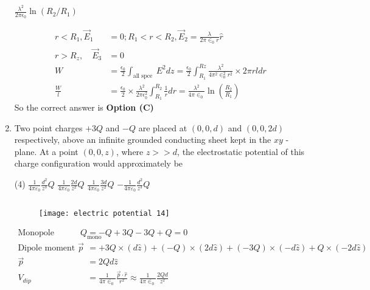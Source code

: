 \begin{enumerate}
\begin{tasks}
		\task[\textbf{D.}] $\frac{\lambda^{2}}{2 \pi \epsilon_{0}} \ln \left(R_{2} / R_{1}\right)$
	\end{tasks}
	\begin{answer}
		\begin{align*}
		r<R_{1}, \vec{E}_{1}&=0 ; R_{1}<r<R_{2}, \vec{E}_{2}=\frac{\lambda}{2 \pi \in_{0} r} \hat{r}\\
		r>R_{z}, \quad \vec{E}_{3}&=0\\
		W&=\frac{\epsilon_{0}}{2} \int_{\text {all spce }}{E^{2} d z}=\frac{\epsilon_{0}}{2} \int_{R_{1}}^{R z} \frac{\lambda^{2}}{4 \pi^{2} \in_{0}^{2} r^{2}} \times 2 \pi r l d r\\
		\frac{W}{l}&=\frac{\epsilon_{0}}{2} \times \frac{\lambda^{2}}{2 \pi \epsilon_{0}^{2}} \int_{R_{1}}^{R_{2}} \frac{1}{r} d r=\frac{\lambda^{2}}{4 \pi \in_{0}} \ln \left(\frac{R_{2}}{R_{1}}\right)
		\end{align*}
		So the correct answer is \textbf{Option (C)}
	\end{answer}
	\item Two point charges $+3 Q$ and $-Q$ are placed at $(0,0, d)$ and $(0,0,2 d)$ respectively, above an infinite grounded conducting sheet kept in the $x y$ - plane. At a point $(0,0, z)$, where $z>>d$, the electrostatic potential of this charge configuration would approximately be
	{}
	\begin{tasks}(4)
		\task[\textbf{A.}] $\frac{1}{4 \pi \varepsilon_{0}} \frac{d^{2}}{z^{3}} Q$
		\task[\textbf{B.}] $\frac{1}{4 \pi \varepsilon_{0}} \frac{2 d}{z^{2}} Q$
		\task[\textbf{C.}] $\frac{1}{4 \pi \varepsilon_{0}} \frac{3 d}{z^{2}} Q$
		\task[\textbf{D.}] $-\frac{1}{4 \pi \varepsilon_{0}} \frac{d^{2}}{z^{3}} Q$
	\end{tasks}
	\begin{answer}$\left. \right. $
		\begin{figure}[H]
			\centering
			\texttt{[image: electric potential 14]}
		\end{figure}
		\begin{align*}
		\text{Monopole moment }Q_{\text {mono }}&=-Q+3 Q-3 Q+Q=0\\
		\text{Dipole moment }\vec{p}&=+3 Q \times(d \hat{z})+(-Q) \times(2 d \hat{z})+(-3 Q) \times(-d \hat{z})+Q \times(-2 d \hat{z})\\
		\vec{p}&=2 Q d \hat{z}\\
		V_{d i p}&=\frac{1}{4 \pi \in_{0}} \frac{\vec{p} \cdot \hat{r}}{r^{2}} \approx \frac{1}{4 \pi \in_{0}} \frac{2 Q d}{z^{2}}
		\end{align*}

\end{answer}
\end{enumerate}

